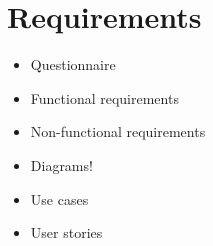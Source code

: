 \chapter{Requirements}

\begin{itemize}
    \item Questionnaire
    \item Functional requirements
    \item Non-functional requirements
    \item Diagrams!
    \item Use cases
    \item User stories
\end{itemize}
